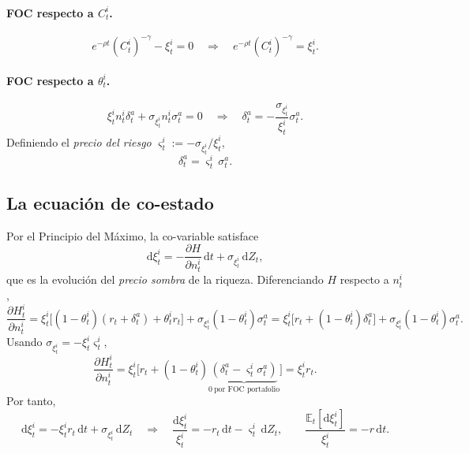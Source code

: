 \documentclass[11pt]{article}
\theoremstyle{definition}
\theoremstyle{remark}
\newcommand{\dd}{\mathrm{d}}
\newcommand{\E}{\mathbb{E}}
\newcommand{\vsig}{\varsigma}
\begin{document}
\paragraph{FOC respecto a $C_t^{i}$.}
\begin{equation}
e^{-\rho t}(C_t^{i})^{-\gamma}-\xi_t^{i}=0
\quad\Longrightarrow\quad
e^{-\rho t}(C_t^{i})^{-\gamma}=\xi_t^{i}.
\end{equation}

\paragraph{FOC respecto a $\theta_t^{i}$.}
\[
\xi_t^{i}n_t^{i}\delta_t^{a}+\sigma_{\xi_t^{i}}n_t^{i}\sigma_t^{a}=0
\quad\Longrightarrow\quad
\delta_t^{a}=-\frac{\sigma_{\xi_t^{i}}}{\xi_t^{i}}\sigma_t^{a}.
\]
Definiendo el \emph{precio del riesgo} $\vsig_t^{i}:=-\sigma_{\xi_t^{i}}/\xi_t^{i}$,
\begin{equation}\label{eq:price-risk}
\boxed{\ \delta_t^{a}=\vsig_t^{i}\,\sigma_t^{a}.\ }
\end{equation}

\subsection{La ecuación de co-estado}

Por el Principio del Máximo, la co-variable satisface
\begin{equation}
\dd\xi_t^{i}=-\frac{\partial H}{\partial n_t^{i}}\,\dd t+\sigma_{\xi_t^{i}}\,\dd Z_t,
\end{equation}
que es la evolución del \emph{precio sombra} de la riqueza. Diferenciando $H$ respecto a $n_t^{i}$,
\[
\frac{\partial H_t^{i}}{\partial n_t^{i}}
=\xi_t^{i}\big[(1-\theta_t^{i})(r_t+\delta_t^{a})+\theta_t^{i}r_t\big]+\sigma_{\xi_t^{i}}(1-\theta_t^{i})\sigma_t^{a}
=\xi_t^{i}\big[r_t+(1-\theta_t^{i})\delta_t^{a}\big]+\sigma_{\xi_t^{i}}(1-\theta_t^{i})\sigma_t^{a}.
\]
Usando $\sigma_{\xi_t^{i}}=-\xi_t^{i}\vsig_t^{i}$,
\[
\frac{\partial H_t^{i}}{\partial n_t^{i}}
=\xi_t^{i}\Big[r_t+(1-\theta_t^{i})\underbrace{(\delta_t^{a}-\vsig_t^{i}\sigma_t^{a})}_{0\ \text{por FOC portafolio}}\Big]=\xi_t^{i}r_t.
\]
Por tanto,
\begin{equation}\label{eq:costate}
\dd\xi_t^{i}=-\xi_t^{i}r_t\,\dd t+\sigma_{\xi_t^{i}}\,\dd Z_t
\quad\Longrightarrow\quad
\frac{\dd\xi_t^{i}}{\xi_t^{i}}=-r_t\,\dd t-\vsig_t^{i}\,\dd Z_t,
\qquad
\frac{\E_t[\dd\xi_t^{i}]}{\xi_t^{i}}=-r\,\dd t.
\end{equation}
\end{document}
